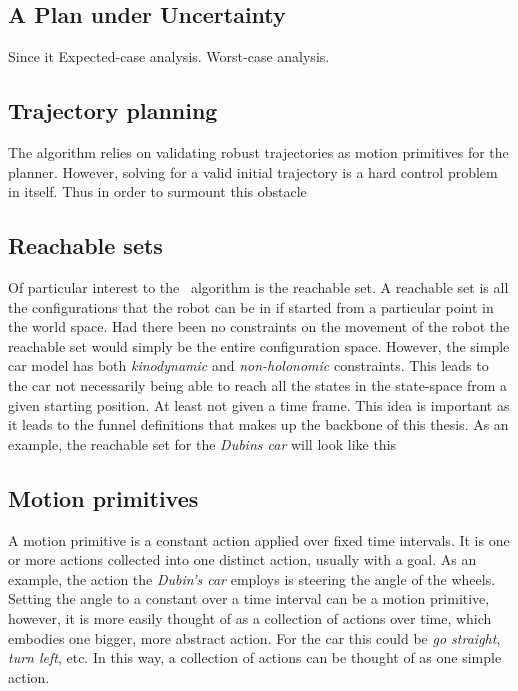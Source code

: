 \subsection{A Plan under Uncertainty}
Since it Expected-case analysis. Worst-case analysis.

\subsection{Trajectory planning}

The \rrtfunnel{} algorithm relies on validating robust trajectories as motion
primitives for the planner. However, solving for a valid initial trajectory is a
hard control problem in itself. Thus in order to surmount this obstacle

\subsection{Reachable sets}

Of particular interest to the \rrtfunnel\ algorithm is the reachable set. A
reachable set is all the configurations that the robot can be in if started from
a particular point in the world space. Had there been no constraints on the
movement of the robot the reachable set would simply be the entire configuration
space. However, the simple car model has both \textit{kinodynamic} and
\textit{non-holonomic} constraints. This leads to the car not necessarily being
able to reach all the states in the state-space from a given starting position.
At least not given a time frame. This idea is important as it leads to the
funnel definitions that makes up the backbone of this thesis. As an example, the
reachable set for the \textit{Dubins car} will look like this

\begin{figure}
  \centering 
\end{figure}

\subsection{Motion primitives}

A motion primitive is a constant action applied over fixed time intervals. It is
one or more actions collected into one distinct action, usually with a goal. As
an example, the action the \textit{Dubin's car} employs is steering the angle of
the wheels. Setting the angle to a constant over a time interval can be a motion
primitive, however, it is more easily thought of as a collection of actions over
time, which embodies one bigger, more abstract action. For the car this could be
\textit{go straight}, \textit{turn left}, etc. In this way, a collection of
actions can be thought of as one simple action.

